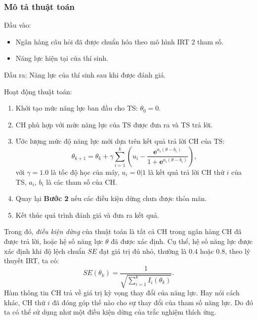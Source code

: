 \subsubsection{Mô tả thuật toán}

\noindent Đầu vào:\par
\begin{itemize}
	\item Ngân hàng câu hỏi đã được chuẩn hóa theo mô hình IRT 2 tham số.
	\item Năng lực hiện tại của thí sinh.
\end{itemize}\par
\noindent Đầu ra: Năng lực của thí sinh sau khi được đánh giá.\par
\noindent Hoạt động thuật toán:\par
\begin{enumerate}[label=\textbf{Bước \arabic*.},align=left,left=0cm..0cm,itemindent=*]
	\item Khởi tạo mức năng lực ban đầu cho TS: $\theta_0=0$.
	\item CH phù hợp với mức năng lực của TS được đưa ra và TS trả lời.
	\item Ước lượng mức độ năng lực mới dựa trên kết quả trả lời CH của TS:
	$$\theta_{k+1}=\theta_k+\gamma\sum_{i=1}^{k}\left(u_i-\frac{\mathbf{e}^{a_i(\theta-b_i)}}{1+\mathbf{e}^{a_i(\theta-b_i)}}\right),$$
	với $\gamma=1.0$ là tốc độ học của máy, $u_i=0|1$ là kết quả trả lời CH thứ $i$ của TS, $a_i$, $b_i$ là các tham số của CH.
	\item Quay lại \textbf{Bước 2} nếu các điều kiện dừng chưa được thỏa mãn.
	\item Kết thúc quá trình đánh giá và đưa ra kết quả.
\end{enumerate}\par
Trong đó, \textit{điều kiện dừng} của thuật toán là tất cả CH trong ngân hàng CH đã được trả lời, hoặc hệ số năng lực $\theta$ đã được xác định. Cụ thể, hệ số năng lực được xác định khi độ lệch chuẩn $SE$ đạt giá trị đủ nhỏ, thường là $0.4$ hoặc $0.8$, theo lý thuyết IRT, ta có:
$$SE(\theta_k)=\frac{1}{\sqrt{\sum_{i=1}^{k}I_i(\theta_k)}}.$$
Hàm thông tin CH trả về giá trị kỳ vọng thay đổi của năng lực. Hay nói cách khác, CH thứ $i$ đã đóng góp thế nào cho sự thay đổi của tham số năng lực. Do đó ta có thể sử dụng như một điều kiện dừng của trắc nghiệm thích ứng.\par

